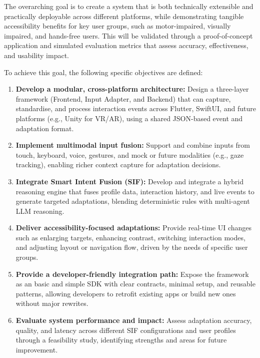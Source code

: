 \documentclass[openany]{book}
\begin{document}
The overarching goal is to create a system that is both technically extensible and practically deployable across different platforms, while demonstrating tangible accessibility benefits for key user groups, such as motor-impaired, visually impaired, and hands-free users. This will be validated through a proof-of-concept application and simulated evaluation metrics that assess accuracy, effectiveness, and usability impact.

To achieve this goal, the following specific objectives are defined:
\begin{enumerate}
    \item \textbf{Develop a modular, cross-platform architecture:} Design a three-layer framework (Frontend, Input Adapter, and Backend) that can capture, standardise, and process interaction events across Flutter, SwiftUI, and future platforms (e.g., Unity for VR/AR), using a shared JSON-based event and adaptation format.
    \item \textbf{Implement multimodal input fusion:} Support and combine inputs from touch, keyboard, voice, gestures, and mock or future modalities (e.g., gaze tracking), enabling richer context capture for adaptation decisions.
    \item \textbf{Integrate Smart Intent Fusion (SIF):} Develop and integrate a hybrid reasoning engine that fuses profile data, interaction history, and live events to generate targeted adaptations, blending deterministic rules with multi-agent LLM reasoning.
    \item \textbf{Deliver accessibility-focused adaptations:} Provide real-time UI changes such as enlarging targets, enhancing contrast, switching interaction modes, and adjusting layout or navigation flow, driven by the needs of specific user groups.
    \item \textbf{Provide a developer-friendly integration path:} Expose the framework as an basic and simple SDK with clear contracts, minimal setup, and reusable patterns, allowing developers to retrofit existing apps or build new ones without major rewrites.
    \item \textbf{Evaluate system performance and impact:} Assess adaptation accuracy, quality, and latency across different SIF configurations and user profiles through a feasibility study, identifying strengths and areas for future improvement.
\end{enumerate}

\newpage 
\end{document}
